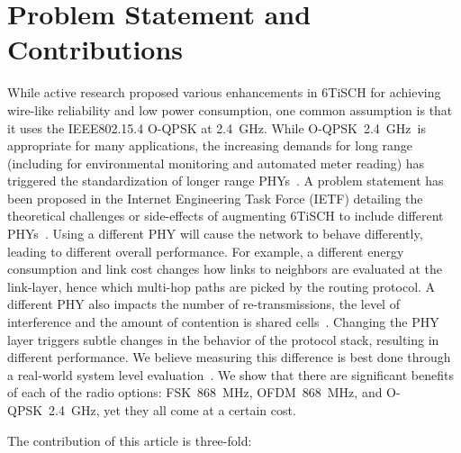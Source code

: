 \documentclass[sensors,article,submit,moreauthors,pdftex]{Definitions/mdpi}
\newcommand{\fsk}           {FSK~868~MHz}
\newcommand{\oqpsk}         {O-QPSK~2.4~GHz}
\newcommand{\ofdm}          {OFDM~868~MHz}
\begin{document}
\section{Problem Statement and Contributions}
\label{sec:contributions}


While active research proposed various enhancements in 6TiSCH  for achieving wire-like reliability and low power consumption,
    one common assumption is that it uses the IEEE802.15.4 O-QPSK at 2.4~GHz.
While \oqpsk\ is appropriate for many applications,
   the increasing demands for long range (including for environmental monitoring and automated meter reading) has triggered the standardization of longer range PHYs~\cite{munoz18evaluation}.
A problem statement has been proposed in the Internet Engineering Task Force (IETF) detailing the theoretical challenges or side-effects of augmenting 6TiSCH to include different PHYs~\cite{draft-munoz-6tisch-multi-phy-nodes}. 
Using a different PHY will cause the network to behave differently, leading to different overall performance.
For example, a different energy consumption and link cost changes how links to neighbors are evaluated at the link-layer,
    hence which multi-hop paths are picked by the routing protocol.
A different PHY also impacts
    the number of re-transmissions,
    the level of interference and
    the amount of contention is shared cells~\cite{kim15hybrid}.
Changing the PHY layer triggers subtle changes in the behavior of the protocol stack,
    resulting in different performance.
We believe measuring this difference is best done through a real-world system level evaluation~\cite{saltzer84endtoend}.
We show that there are significant benefits of each of the radio options: \fsk, \ofdm, and \oqpsk, yet they all come at a certain cost.


The contribution of this article is three-fold:
\end{document}
